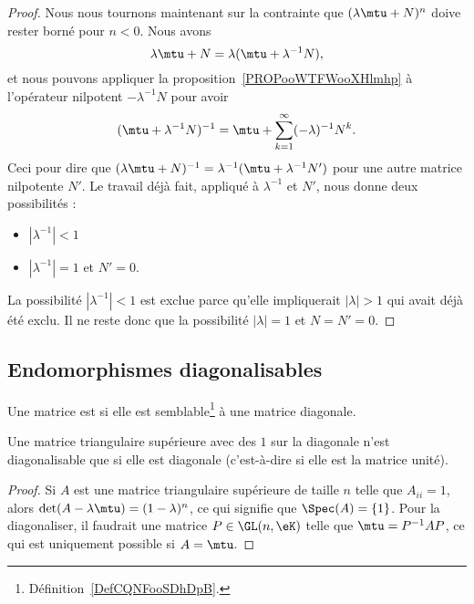 \begin{proof}
    Nous nous tournons maintenant sur la contrainte que \( (\lambda\mtu+N)^n\) doive rester borné pour \( n<0\). Nous avons
    \begin{equation}
        \lambda\mtu+N=\lambda(\mtu+\lambda^{-1}N),
    \end{equation}
    et nous pouvons appliquer la proposition~\ref{PROPooWTFWooXHlmhp} à l'opérateur nilpotent \( -\lambda^{-1} N\) pour avoir
    \begin{equation}
        (\mtu+\lambda^{-1}N)^{-1}=\mtu+\sum_{k=1}^{\infty}(-\lambda)^{-1}N^k.
    \end{equation}
    Ceci pour dire que \( (\lambda\mtu+N)^{-1}=\lambda^{-1}(\mtu+\lambda^{-1}N')\) pour une autre matrice nilpotente \( N'\). Le travail déjà fait, appliqué à \( \lambda^{-1}\) et \( N'\), nous donne deux possibilités :
    \begin{itemize}
        \item \( | \lambda^{-1} |<1\)
        \item \( | \lambda^{-1} |=1\) et \( N'=0\).
    \end{itemize}
    La possibilité \( | \lambda^{-1} |<1\) est exclue parce qu'elle impliquerait \( | \lambda |>1\) qui avait déjà été exclu. Il ne reste donc que la possibilité \( | \lambda |=1\) et \( N=N'=0\).
\end{proof}

\subsection{Endomorphismes diagonalisables}

\begin{definition}  \label{DefCNJqsmo}
    Une matrice est  si elle est semblable\footnote{Définition~\ref{DefCQNFooSDhDpB}.} à une matrice diagonale.
\end{definition}

\begin{lemma}
    Une matrice triangulaire supérieure avec des \( 1\) sur la diagonale n'est diagonalisable que si elle est diagonale (c'est-à-dire si elle est la matrice unité).
\end{lemma}

\begin{proof}
    Si \( A\) est une matrice triangulaire supérieure de taille \( n\) telle que \( A_{ii}=1\), alors \( \det(A-\lambda\mtu)=(1-\lambda)^n\), ce qui signifie que \( \Spec(A)=\{ 1 \}\). Pour la diagonaliser, il faudrait une matrice \( P\in\GL(n,\eK)\) telle que \( \mtu=P^{-1}AP\), ce qui est uniquement possible si \( A=\mtu\).
\end{proof}

